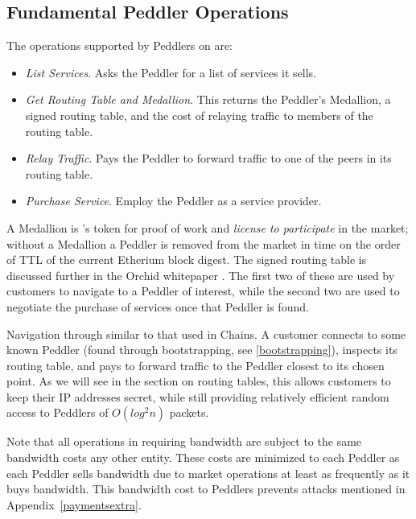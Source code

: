 \subsection{Fundamental Peddler Operations}

The operations supported by Peddlers on \tOM{} are:

\begin{itemize}
\item \emph{List Services}. Asks the Peddler for a list of services it sells.
\item \emph{Get Routing Table and Medallion}. This returns the Peddler's Medallion, a signed routing table, and the cost of relaying traffic to members of the routing table.
\item \emph{Relay Traffic}. Pays the Peddler to forward traffic to one of the peers in its routing table.
\item \emph{Purchase Service}. Employ the Peddler as a service provider.
\end{itemize}

A Medallion is \TOM{}'s token for proof of work and \textit{license to participate} in the market; without a Medallion a Peddler is removed from the market in time on the order of TTL of the current Etherium block digest. The signed routing table 
is discussed further in the Orchid whitepaper \cite{orchid}.%
The first two of these are used by customers to navigate to a Peddler of interest, while the second two are used to negotiate the purchase of services once that Peddler is found.

{Navigation through \tOM{} similar to that used in Chains. A customer connects to some known Peddler (found through
bootstrapping, see \ref{bootstrapping}), inspects its routing table, and pays to forward traffic to the Peddler closest to its chosen point. As we will see in the section on routing tables, this allows customers to keep their IP addresses secret, while still providing relatively efficient random access to Peddlers of $O(log^2 n)$ packets.}

Note that all operations in \TOM{} requiring bandwidth are subject to the same bandwidth costs any other entity. These costs are minimized to each Peddler as each Peddler sells bandwidth due to market operations at least as frequently as it buys bandwidth. This bandwidth cost to Peddlers prevents attacks mentioned in Appendix~\ref{paymentsextra}.


